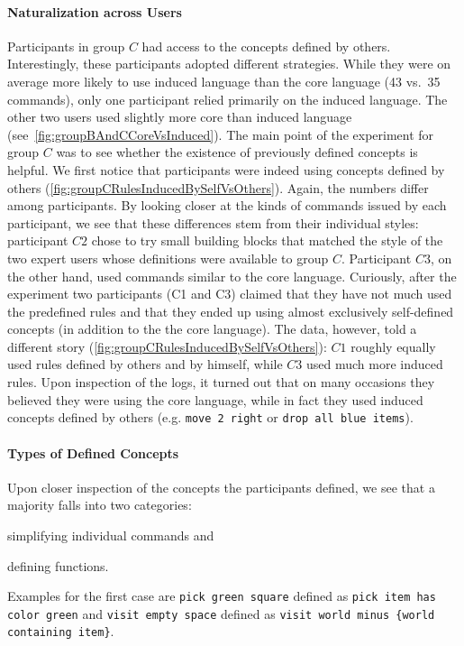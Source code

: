 \paragraph*{\textbf{Naturalization across Users}}
Participants in group $C$ had access to the concepts defined by others. Interestingly, these
participants adopted different strategies. While they were on average more likely to use induced
language than the core language (43 vs.\ 35 commands), only one participant relied primarily on the induced language.
The other two users used slightly more core than induced language (see~\autoref{fig:groupBAndCCoreVsInduced}).
The main point of the experiment for group $C$ was to see whether the existence of previously defined concepts is helpful.
We first notice that participants were indeed using concepts defined by others (\autoref{fig:groupCRulesInducedBySelfVsOthers}). 
Again, the numbers differ among participants. 
By looking closer at the kinds of commands issued by each participant, we see that these differences 
stem from their individual styles: participant $C2$ chose to try small building blocks that matched the style of 
the two expert users whose definitions were available to group $C$. 
Participant $C3$, on the other hand, used commands similar to the core language.
Curiously, after the experiment two participants (C1 and C3) claimed that they have not much used the predefined rules 
and that they ended up using almost exclusively self-defined concepts (in addition to the the core language). 
The data, however, told a different story (\autoref{fig:groupCRulesInducedBySelfVsOthers}): $C1$ roughly equally used rules defined by others and by himself, while $C3$ 
used much more induced rules. 
Upon inspection of the logs, it turned out that on many occasions they believed they were using the core language, while in fact they used induced concepts
defined by others
(e.g. \lstinline{move 2 right} or \lstinline{drop all blue items}).

\paragraph*{\textbf{Types of Defined Concepts}}
Upon closer inspection of the concepts the participants defined, we see that a majority falls into two categories:
\begin{inparaenum}[(1)]
\item simplifying individual commands and
\item defining functions.
\end{inparaenum}
%
Examples for the first case are
\lstinline{pick green square} defined as \lstinline{pick item has color green} and
\lstinline{visit empty space} defined as \lstinline$visit world minus {world containing item}$.

